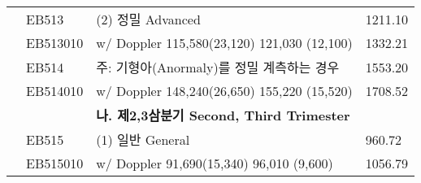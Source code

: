 \begin{table}
\begin{threeparttable}
\begin{tabu}{X|X|X[5.8]|X}
	   & EB513 & (2) 정밀 Advanced  & 1211.10 \\
	   & EB513010 &  \hspace{.5cm}w/ Doppler 115,580(23,120) 121,030 (12,100)&  1332.21\\
	   & EB514 & \hspace{.5cm}\textsf{주: 기형아(Anormaly)를 정밀 계측하는 경우 } & 1553.20 \\
	   & EB514010 &  \hspace{1cm}w/ Doppler 148,240(26,650) 155,220 (15,520)&  1708.52 \\	
	   & & \textbf{나. 제2,3삼분기 Second, Third Trimester} & \\
	   & EB515 & (1) 일반 General & 960.72 \\
	   & EB515010 & \hspace{.5cm}w/ Doppler 91,690(15,340) 96,010 (9,600) &  1056.79 \\ 

\end{tabu}
\end{threeparttable}
\end{table}
